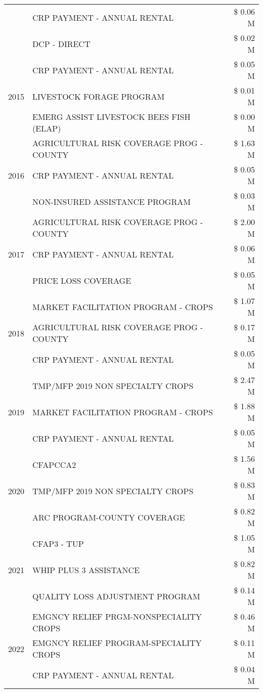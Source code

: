 \begin{tabular}{llr}
 & CRP PAYMENT - ANNUAL RENTAL & \$ 0.06 M \\
 & DCP - DIRECT & \$ 0.02 M \\
\cline{1-3}
\multirow[t]{3}{*}{2015} & CRP PAYMENT - ANNUAL RENTAL & \$ 0.05 M \\
 & LIVESTOCK FORAGE PROGRAM & \$ 0.01 M \\
 & EMERG ASSIST LIVESTOCK BEES FISH (ELAP) & \$ 0.00 M \\
\cline{1-3}
\multirow[t]{3}{*}{2016} & AGRICULTURAL RISK COVERAGE PROG - COUNTY & \$ 1.63 M \\
 & CRP PAYMENT - ANNUAL RENTAL & \$ 0.05 M \\
 & NON-INSURED ASSISTANCE PROGRAM & \$ 0.03 M \\
\cline{1-3}
\multirow[t]{3}{*}{2017} & AGRICULTURAL RISK COVERAGE PROG - COUNTY & \$ 2.00 M \\
 & CRP PAYMENT - ANNUAL RENTAL & \$ 0.06 M \\
 & PRICE LOSS COVERAGE & \$ 0.05 M \\
\cline{1-3}
\multirow[t]{3}{*}{2018} & MARKET FACILITATION PROGRAM - CROPS & \$ 1.07 M \\
 & AGRICULTURAL RISK COVERAGE PROG - COUNTY & \$ 0.17 M \\
 & CRP PAYMENT - ANNUAL RENTAL & \$ 0.05 M \\
\cline{1-3}
\multirow[t]{3}{*}{2019} & TMP/MFP 2019 NON SPECIALTY CROPS & \$ 2.47 M \\
 & MARKET FACILITATION PROGRAM - CROPS & \$ 1.88 M \\
 & CRP PAYMENT - ANNUAL RENTAL & \$ 0.05 M \\
\cline{1-3}
\multirow[t]{3}{*}{2020} & CFAPCCA2 & \$ 1.56 M \\
 & TMP/MFP 2019 NON SPECIALTY CROPS & \$ 0.83 M \\
 & ARC PROGRAM-COUNTY COVERAGE & \$ 0.82 M \\
\cline{1-3}
\multirow[t]{3}{*}{2021} & CFAP3 - TUP & \$ 1.05 M \\
 & WHIP PLUS 3 ASSISTANCE & \$ 0.82 M \\
 & QUALITY LOSS ADJUSTMENT PROGRAM & \$ 0.14 M \\
\cline{1-3}
\multirow[t]{3}{*}{2022} & EMGNCY RELIEF PRGM-NONSPECIALITY CROPS & \$ 0.46 M \\
 & EMGNCY RELIEF PROGRAM-SPECIALITY CROPS & \$ 0.11 M \\
 & CRP PAYMENT - ANNUAL RENTAL & \$ 0.04 M \\
\cline{1-3}
\bottomrule
\end{tabular}
